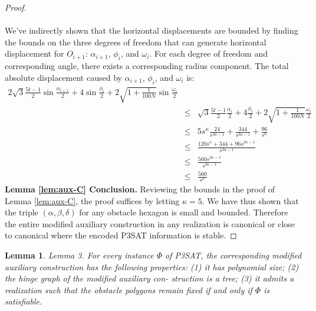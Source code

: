 \documentclass[10pt]{CSUNthesis}
\theoremstyle{plain}%
\newtheorem{lem}{Lemma}
\theoremstyle{definition}
\theoremstyle{remark}
\begin{document}
\begin{proof}
\paragraph{}  We've indirectly shown that the horizontal displacements are bounded by finding the bounds on the three degrees of freedom that can generate horizontal displacement for $O_{i+1}$: $\alpha_{i+1}$, $\phi_i$, and $\omega_i$.  
For each degree of freedom and corresponding angle, there exists a corresponding radius component.  
The total absolute displacement caused by $\alpha_{i+1}$, $\phi_i$, and $\omega_i$ is:
\begin{eqnarray*}
2\sqrt{3} \frac{5t-1}{2} \sin \frac{\alpha_{i+1}}{2} + 4 \sin \frac{\phi_i}{2} + 2 \sqrt{1 + \frac{1}{100N}} \sin \frac{\omega_i}{2}  \\
&\leq& \sqrt{3} \frac{5t-1}{2} \frac{\alpha_i}{2} + 4 \frac{\phi_i}{2} + 2 \sqrt{1 + \frac{1}{100N}} \frac{\omega_i}{2}  \\  
&\leq&  5s^\kappa \frac{24}{s^{3\kappa-1}} +  \frac{344}{s^{3\kappa - 1}} +  \frac{96}{s^\kappa}\\
&\leq& \frac{120s^\kappa + 344 + 96 s^{2\kappa - 1} }{s^{3\kappa - 1}} \\
&\leq& \frac{560 s^{2\kappa - 1} }{s^{3\kappa - 1}}\\
&\leq& \frac{560  }{s^\kappa }
\end{eqnarray*}\textbf{Lemma \ref{lem:aux-C} Conclusion.} 
Reviewing the bounds in the proof of Lemma \ref{lem:aux-C}, the proof suffices by letting $\kappa = 5$.  
We have thus shown that the triple $(\alpha, \beta, \delta)$ for any obstacle hexagon is small and bounded.  
Therefore the entire modified auxiliary construction in any realization is canonical or close to canonical where the encoded P3SAT information is stable.
\end{proof}\begin{lem}\label{lem:lePieceDuResistance}
Lemma 3. For every instance $\Phi$ of P3SAT, the corresponding modified auxiliary construction
has the following properties: (1) it has polynomial size; (2) the hinge graph of the modified auxiliary con-
struction is a tree; (3) it admits a realization such that the obstacle polygons remain fixed if and only if $\Phi$ is
satisfiable.
\end{lem}
\end{document}
